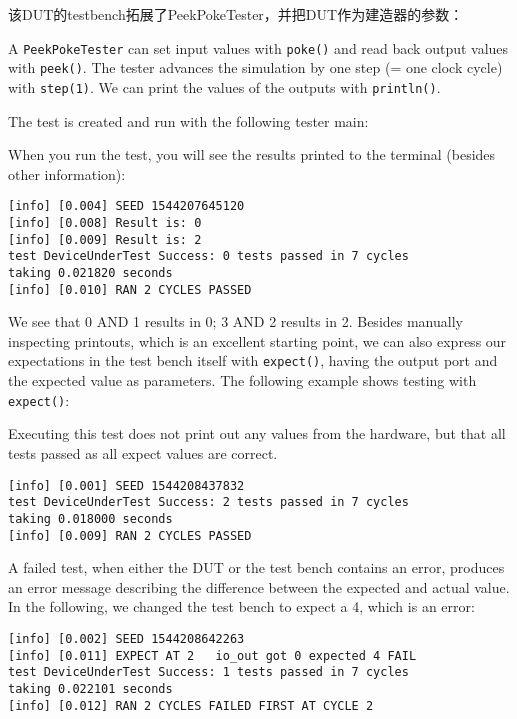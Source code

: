 \documentclass[%
    10pt,
    headinclude, footexclude,
    openright, %
    notitlepage,
    cleardoubleempty,
    headsepline,
    pointlessnumbers,
    bibtotoc, idxtotoc,
    ]{scrbook}
\newcommand{\code}[1]{{\small{\texttt{#1}}}}
\begin{document}
该DUT的testbench拓展了PeekPokeTester，并把DUT作为建造器的参数：


\noindent A \code{PeekPokeTester} can set input values with \code{poke()} and
read back output values with \code{peek()}. The tester advances the simulation by one
step (= one clock cycle) with \code{step(1)}.
We can print the values of the outputs with \code{println()}.

The test is created and run with the following tester main:


\noindent When you run the test, you will see the results printed to the terminal
(besides other information):

\begin{verbatim}
[info] [0.004] SEED 1544207645120
[info] [0.008] Result is: 0
[info] [0.009] Result is: 2
test DeviceUnderTest Success: 0 tests passed in 7 cycles
taking 0.021820 seconds
[info] [0.010] RAN 2 CYCLES PASSED
\end{verbatim}

\noindent We see that 0 AND 1 results in 0; 3 AND 2 results in 2.
Besides manually inspecting printouts, which is an excellent starting point, we can also
express our expectations in the test bench itself with \code{expect()},
having the output port and the expected value as parameters.
The following example shows testing with \code{expect()}:


\noindent Executing this test does not print out any values from the hardware,
but that all tests passed as all expect values are correct.

\begin{verbatim}
[info] [0.001] SEED 1544208437832
test DeviceUnderTest Success: 2 tests passed in 7 cycles
taking 0.018000 seconds
[info] [0.009] RAN 2 CYCLES PASSED
\end{verbatim}

\noindent A failed test, when either the DUT or the test bench contains an error,
produces an error message describing the difference between the expected and actual
value. In the following, we changed the test bench to expect a 4, which is an error:

\begin{verbatim}
[info] [0.002] SEED 1544208642263
[info] [0.011] EXPECT AT 2   io_out got 0 expected 4 FAIL
test DeviceUnderTest Success: 1 tests passed in 7 cycles
taking 0.022101 seconds
[info] [0.012] RAN 2 CYCLES FAILED FIRST AT CYCLE 2
\end{verbatim}
\end{document}
